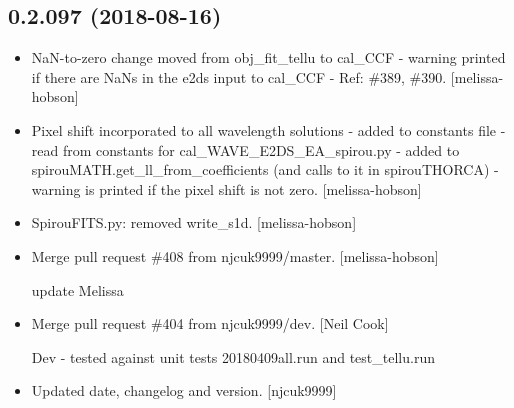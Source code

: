 \documentclass[a4paper,10pt,english]{report}
\begin{document}
\subsection{0.2.097 (2018-08-16)}
\label{\detokenize{misc/changelog:id366}}\begin{itemize}
\item {} 
NaN-to-zero change moved from obj\_fit\_tellu to cal\_CCF - warning
printed if there are NaNs in the e2ds input to cal\_CCF - Ref: \#389,
\#390. {[}melissa-hobson{]}

\item {} 
Pixel shift incorporated to all wavelength solutions - added to
constants file - read from constants for cal\_WAVE\_E2DS\_EA\_spirou.py -
added to spirouMATH.get\_ll\_from\_coefficients (and calls to it in
spirouTHORCA) - warning is printed if the pixel shift is not zero.
{[}melissa-hobson{]}

\item {} 
SpirouFITS.py: removed write\_s1d. {[}melissa-hobson{]}

\item {} 
Merge pull request \#408 from njcuk9999/master. {[}melissa-hobson{]}

update Melissa

\item {} 
Merge pull request \#404 from njcuk9999/dev. {[}Neil Cook{]}

Dev - tested against unit tests 20180409all.run and test\_tellu.run

\item {} 
Updated date, changelog and version. {[}njcuk9999{]}

\end{itemize}
\end{document}

